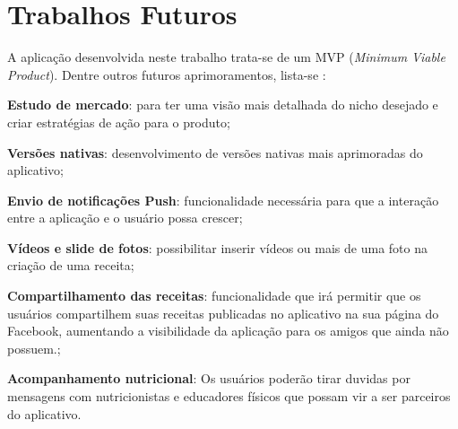 
\chapter{Trabalhos Futuros}


A aplicação desenvolvida neste trabalho trata-se de um MVP (\textit{Minimum Viable Product}). Dentre outros futuros aprimoramentos, lista-se : 

\begin{lista}
   
     \item \textbf{Estudo de mercado}:  para ter uma visão mais detalhada do nicho desejado e criar estratégias de ação para o produto;
      \item \textbf{Versões nativas}: desenvolvimento de versões nativas mais aprimoradas do aplicativo;
	\item \textbf{Envio de notificações Push}: funcionalidade necessária para que a interação entre a aplicação e o usuário possa crescer;
	\item \textbf{Vídeos e slide de fotos}: possibilitar inserir vídeos ou mais de uma foto na criação de uma receita;
	\item \textbf{Compartilhamento das receitas}: funcionalidade que irá permitir que os usuários compartilhem suas receitas publicadas no aplicativo na sua página do Facebook, aumentando a visibilidade da aplicação para os amigos que ainda não possuem.;
	\item \textbf{Acompanhamento nutricional}: Os usuários
	poderão tirar duvidas por mensagens com nutricionistas e educadores físicos que possam vir a ser parceiros do aplicativo.
\end{lista}
